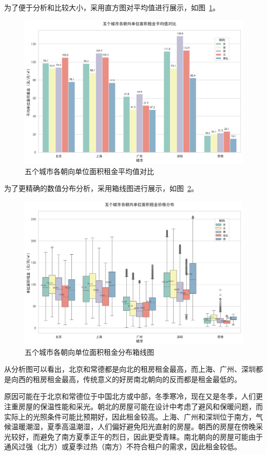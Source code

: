 为了便于分析和比较大小，采用直方图对平均值进行展示，如图~\ref{fig:direction_unit_price_bar_chart}。
\begin{figure}[htbp]
    \centering
    \includegraphics[width=0.7\linewidth]{../../figure/direction_unit_price_bar_chart.png}
    \caption{五个城市各朝向单位面积租金平均值对比}
    \label{fig:direction_unit_price_bar_chart}
\end{figure}

为了更精确的数值分布分析，采用箱线图进行展示，如图~\ref{fig:direction_unit_price_box_chart}。
\begin{figure}[htbp]
    \centering
    \includegraphics[width=0.7\linewidth]{../../figure/direction_unit_price_box_chart.png}
    \caption{五个城市各朝向单位面积租金分布箱线图}
    \label{fig:direction_unit_price_box_chart}
\end{figure}

从分析图可以看出，北京和常德都是向北的租房租金最高，而上海、广州、深圳都是向西的租房租金最高，传统意义的好房南北朝向的反而都是租金最低的。

原因可能在于北京和常德位于中国北方或中部，冬季寒冷，现在又是冬季，人们更注重房屋的保温性能和采光。朝北的房屋可能在设计中考虑了避风和保暖问题，而实际上的光照条件可能比预期好，因此租金较高。上海、广州和深圳位于南方，气候温暖潮湿，夏季高温潮湿，人们偏好避免阳光直射的房屋。朝西的房屋在傍晚采光较好，而避免了南方夏季正午的烈日，因此更受青睐。南北朝向的房屋可能由于通风过强（北方）或夏季过热（南方）不符合租户的需求，因此租金较低。

